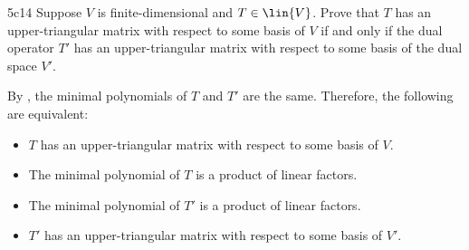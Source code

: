 \begin{exercise}{5c14}
    Suppose $V$ is finite-dimensional and $T \in \lin{V}$.
    Prove that $T$ has an upper-triangular matrix with respect to some basis of $V$ if and only if the dual operator $T'$ has an upper-triangular matrix with respect to some basis of the dual space $V'$.

\end{exercise}

\begin{sol}
    By , the minimal polynomials of $T$ and $T'$ are the same.
    Therefore, the following are equivalent:
    \begin{itemize}
        \item $T$ has an upper-triangular matrix with respect to some basis of $V$.
        \item The minimal polynomial of $T$ is a product of linear factors.
        \item The minimal polynomial of $T'$ is a product of linear factors.
        \item $T'$ has an upper-triangular matrix with respect to some basis of $V'$. \qedhere
    \end{itemize}
\end{sol}